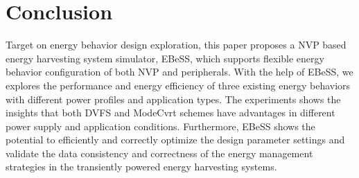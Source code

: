 \section{Conclusion}	\label{sec:sum}
%
Target on energy behavior design exploration, this paper proposes a NVP based energy harvesting system simulator, EBeSS, which supports flexible energy behavior configuration of both NVP and peripherals.
With the help of EBeSS, we explores the performance and energy efficiency of three existing energy behaviors with different power profiles and application types. 
The experiments shows the insights that both DVFS and ModeCvrt schemes have advantages in different power supply and application conditions.
Furthermore, EBeSS shows the potential to efficiently and correctly optimize the design parameter settings and validate the data consistency and correctness of the energy management strategies in the transiently powered energy harvesting systems.

%
